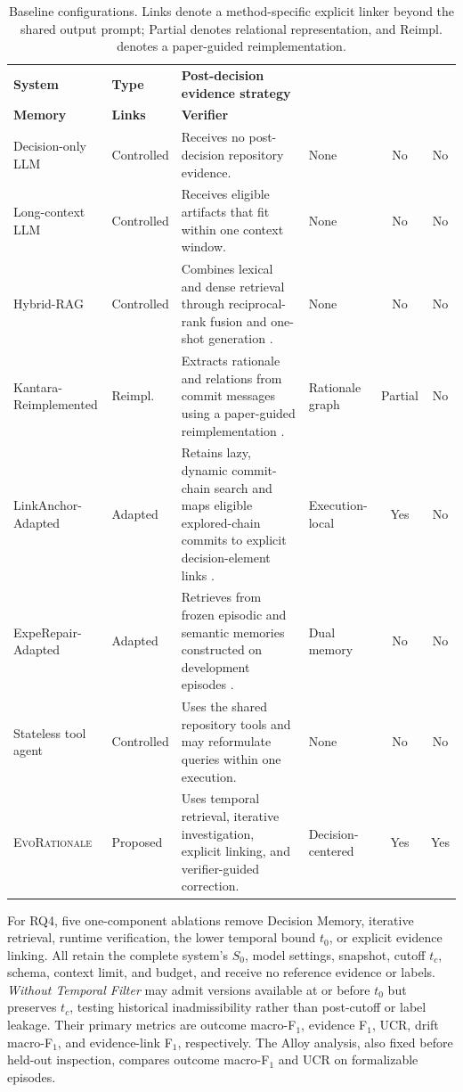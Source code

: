 \documentclass[10pt,conference]{IEEEtran}
\begin{document}
\begin{table}[!t]
\caption{Baseline configurations. Links denote a method-specific explicit linker beyond the shared output prompt; Partial denotes relational representation, and Reimpl. denotes a paper-guided reimplementation.}
\label{tab:baseline-summary}
\centering
\small
\setlength{\tabcolsep}{4pt}
\begin{tabularx}{\textwidth}{@{}>{\raggedright\arraybackslash}p{2.90cm}>{\raggedright\arraybackslash}p{1.55cm}>{\raggedright\arraybackslash}X>{\raggedright\arraybackslash}p{1.75cm}cc@{}}
\toprule
\textbf{System} & \textbf{Type} & \textbf{Post-decision evidence strategy} & \shortstack[l]{\textbf{State/}\\\textbf{Memory}} & \textbf{Links} & \textbf{Verifier} \\
\midrule
Decision-only LLM & Controlled & Receives no post-decision repository evidence. & None & No & No \\
Long-context LLM & Controlled & Receives eligible artifacts that fit within one context window. & None & No & No \\
Hybrid-RAG & Controlled & Combines lexical and dense retrieval through reciprocal-rank fusion and one-shot generation \cite{Wang2026RepoReasoner,Ke2026RAG}. & None & No & No \\
Kantara-Reimplemented & Reimpl. & Extracts rationale and relations from commit messages using a paper-guided reimplementation \cite{Dhaouadi2025Kantara}. & Rationale graph & Partial & No \\
LinkAnchor-Adapted & Adapted & Retains lazy, dynamic commit-chain search and maps eligible explored-chain commits to explicit decision-element links \cite{Akhavan2026LinkAnchor}. & Execution-local & Yes & No \\
ExpeRepair-Adapted & Adapted & Retrieves from frozen episodic and semantic memories constructed on development episodes \cite{Mu2026ExpeRepair}. & Dual memory & No & No \\
Stateless tool agent & Controlled & Uses the shared repository tools and may reformulate queries within one execution. & None & No & No \\
\textsc{EvoRationale} & Proposed & Uses temporal retrieval, iterative investigation, explicit linking, and verifier-guided correction. & Decision-centered & Yes & Yes \\
\bottomrule
\end{tabularx}
\end{table}
For RQ4, five one-component ablations remove Decision Memory, iterative retrieval, runtime verification, the lower temporal bound $t_0$, or explicit evidence linking. All retain the complete system's $S_0$, model settings, snapshot, cutoff $t_c$, schema, context limit, and budget, and receive no reference evidence or labels. \emph{Without Temporal Filter} may admit versions available at or before $t_0$ but preserves $t_c$, testing historical inadmissibility rather than post-cutoff or label leakage. Their primary metrics are outcome macro-F$_1$, evidence F$_1$, UCR, drift macro-F$_1$, and evidence-link F$_1$, respectively. The Alloy analysis, also fixed before held-out inspection, compares outcome macro-F$_1$ and UCR on formalizable episodes.
\end{document}

